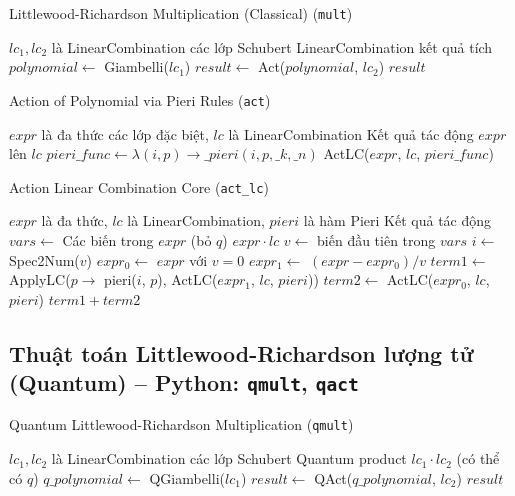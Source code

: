 \begin{algorithm}[H]
\caption{Littlewood-Richardson Multiplication (Classical) (\texttt{mult})}
\begin{algorithmic}[1]
\REQUIRE $lc_1, lc_2$ là LinearCombination các lớp Schubert
\ENSURE LinearCombination kết quả tích
\STATE $polynomial \gets$ Giambelli($lc_1$)
\STATE $result \gets$ Act($polynomial$, $lc_2$)
\RETURN $result$
\end{algorithmic}
\end{algorithm}

\begin{algorithm}[H]
\caption{Action of Polynomial via Pieri Rules (\texttt{act})}
\begin{algorithmic}[1]
\REQUIRE $expr$ là đa thức các lớp đặc biệt, $lc$ là LinearCombination
\ENSURE Kết quả tác động $expr$ lên $lc$
\STATE $pieri\_func \gets \lambda(i,p) \to \_pieri(i, p, \_k, \_n)$
\RETURN ActLC($expr$, $lc$, $pieri\_func$)
\end{algorithmic}
\end{algorithm}

\begin{algorithm}[H]
\caption{Action Linear Combination Core (\texttt{act\_lc})}
\begin{algorithmic}[1]
\REQUIRE $expr$ là đa thức, $lc$ là LinearCombination, $pieri$ là hàm Pieri
\ENSURE Kết quả tác động
\STATE $vars \gets$ Các biến trong $expr$ (bỏ $q$)
    \RETURN $expr \cdot lc$
\ENDIF
\STATE $v \gets$ biến đầu tiên trong $vars$
\STATE $i \gets$ Spec2Num($v$)
\STATE $expr_0 \gets$ $expr$ với $v=0$
\STATE $expr_1 \gets$ $(expr - expr_0)/v$
\STATE $term1 \gets$ ApplyLC($p \to$ pieri($i$, $p$), ActLC($expr_1$, $lc$, $pieri$))
\STATE $term2 \gets$ ActLC($expr_0$, $lc$, $pieri$)
\RETURN $term1 + term2$
\end{algorithmic}
\end{algorithm}

\subsection*{Thuật toán Littlewood-Richardson lượng tử (Quantum) -- Python: \texttt{qmult}, \texttt{qact}}

\begin{algorithm}[H]
\caption{Quantum Littlewood-Richardson Multiplication (\texttt{qmult})}
\begin{algorithmic}[1]
\REQUIRE $lc_1, lc_2$ là LinearCombination các lớp Schubert
\ENSURE Quantum product $lc_1 \cdot lc_2$ (có thể có $q$)
\STATE $q\_polynomial \gets$ QGiambelli($lc_1$)
\STATE $result \gets$ QAct($q\_polynomial$, $lc_2$)
\RETURN $result$
\end{algorithmic}
\end{algorithm}